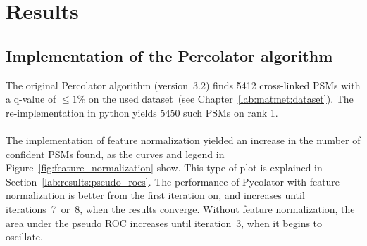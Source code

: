 \chapter{Results}
\label{results}


\section{Implementation of the Percolator algorithm}
The original Percolator algorithm (version~3.2) finds 5412 cross-linked PSMs with a q-value of $\leq1\%$ on the used dataset~(see Chapter~\ref{lab:matmet:dataset}). The re-implementation in python yields 5450 such PSMs on rank 1.\\\\
The implementation of feature normalization yielded an increase in the number of confident PSMs found, as the curves and legend in Figure~\ref{fig:feature_normalization} show. This type of plot is explained in Section~\ref{lab:results:pseudo_rocs}. The performance of Pycolator with feature normalization is better from the first iteration on, and increases until iterations~7~or~8, when the results converge. Without feature normalization, the area under the pseudo ROC increases until iteration~3, when it begins to oscillate. \\
\renewcommand{\baselinestretch}{0.9}
